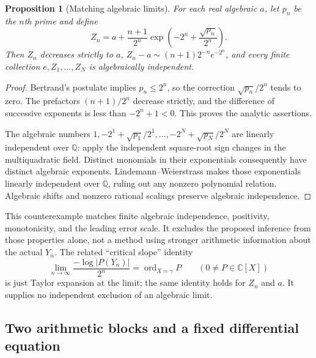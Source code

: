 \documentclass[11pt,a4paper]{article}
\newtheorem{proposition}[theorem]{Proposition}
\theoremstyle{definition}
\theoremstyle{remark}
\numberwithin{equation}{section}
\begin{document}
\begin{proposition}[Matching algebraic limits]
\label{gamma-limit-counterexample}
For each real algebraic $a$, let $p_n$ be the $n$th prime and define
\[
 Z_n=a+\frac{n+1}{2^n}
 \exp\left(-2^n+\frac{\sqrt{p_n}}{2^n}\right).
\]
Then $Z_n$ decreases strictly to $a$,
$Z_n-a\sim(n+1)2^{-n}e^{-2^n}$, and every finite collection
$e,Z_1,\ldots,Z_N$ is algebraically independent.
\end{proposition}
\begin{proof}
Bertrand's postulate implies $p_n\le2^n$, so the correction
$\sqrt{p_n}/2^n$ tends to zero. The prefactors $(n+1)/2^n$ decrease
strictly, and the difference of successive exponents is less than
$-2^n+1<0$. This proves the analytic assertions.

The algebraic numbers
$1,-2^1+\sqrt{p_1}/2^1,\ldots,-2^N+\sqrt{p_N}/2^N$ are linearly
independent over $\mathbb Q$: apply the independent square-root sign
changes in the multiquadratic field. Distinct monomials in their
exponentials consequently have distinct algebraic exponents.
Lindemann--Weierstrass makes those exponentials linearly independent
over $\overline{\mathbb Q}$, ruling out any nonzero polynomial
relation. Algebraic shifts and nonzero rational scalings preserve
algebraic independence.
\end{proof}

This counterexample matches finite algebraic independence, positivity,
monotonicity, and the leading error scale. It excludes the proposed
inference from those properties alone, not a method using stronger
arithmetic information about the actual $Y_n$. The related ``critical
slope'' identity
\[
 \lim_{n\to\infty}\frac{-\log|P(Y_n)|}{2^n}
 =\operatorname{ord}_{X=\gamma}P
 \qquad(0\ne P\in\mathbb C[X])
\]
is just Taylor expansion at the limit; the same identity holds for
$Z_n$ and $a$. It supplies no independent exclusion of an algebraic
limit.

\subsection{Two arithmetic blocks and a fixed differential equation}
\label{gamma-gevrey}
\end{document}
